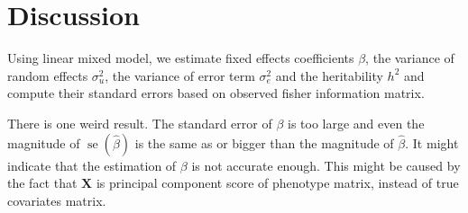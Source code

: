\documentclass{article}
\newcommand{\se}[1]{\operatorname{se}(#1)}
\begin{document}
\section{Discussion}
Using linear mixed model, we estimate fixed effects coefficients $ \beta $, the variance of random effects $ \sigma^{2}_{u} $, the variance of error term $ \sigma^{2}_{e} $ and the heritability $ h^{2} $ and compute their standard errors based on observed fisher information matrix.

There is one weird result. The standard error of $ \beta $ is too large and even the magnitude of $ \se{\hat{\beta}} $ is the same as or bigger than the magnitude of $ \hat{\beta} $. It might indicate that the estimation of $ \beta $ is not accurate enough. This might be caused by the fact that $ \mathbf{X} $ is principal component score of phenotype matrix, instead of true covariates matrix.
\end{document}

